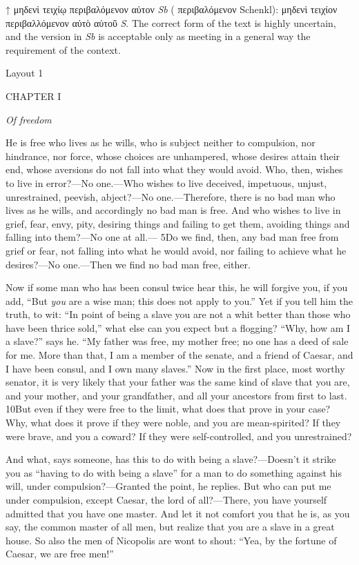 

↑ μηδενὶ τειχίῳ περιβαλόμενον αὐτον \emph{Sb} ( περιβαλόμενον Schenkl): μηδενὶ τειχίον περιβαλλόμενον αὐτὸ αὐτοῦ \emph{S}. The correct form of the text is highly uncertain, and the version in \emph{Sb} is acceptable only as meeting in a general way the requirement of the context.



Layout 1

CHAPTER I

\emph{Of freedom}

He is free who lives as he wills, who is subject neither to compulsion, nor hindrance, nor force, whose choices are unhampered, whose desires attain their end, whose aversions do not fall into what they would avoid. Who, then, wishes to live in error?—No one.—Who wishes to live deceived, impetuous, unjust, unrestrained, peevish, abject?—No one.—Therefore, there is no bad man who lives as he wills, and accordingly no bad man is free. And who wishes to live in grief, fear, envy, pity, desiring things and failing to get them, avoiding things and falling into them?—No one at all.— 5Do we find, then, any bad man free from grief or fear, not falling into what he would avoid, nor failing to achieve what he desires?—No one.—Then we find no bad man free, either.

Now if some man who has been consul twice hear this, he will forgive you, if you add, ``But \emph{you} are a wise man; this does not apply to you.'' Yet if you tell him the truth, to wit: ``In point of being a slave you are not a whit better than those who have been thrice sold,'' what else can you expect but a flogging? ``Why, how am I a slave?'' says he. ``My father was free, my mother free; no one has a deed of sale for me. More than that, I am a member of the senate, and a friend of Caesar, and I have been consul, and I own many slaves.'' Now in the first place, most worthy senator, it is very likely that your father was the same kind of slave that you are, and your mother, and your grandfather, and all your ancestors from first to last. 10But even if they were free to the limit, what does that prove in your case? Why, what does it prove if they were noble, and you are mean-spirited? If they were brave, and you a coward? If they were self-controlled, and you unrestrained?

And what, says someone, has this to do with being a slave?—Doesn't it strike you as ``having to do with being a slave'' for a man to do something against his will, under compulsion?—Granted the point, he replies. But who can put me under compulsion, except Caesar, the lord of all?—There, you have yourself admitted that you have one master. And let it not comfort you that he is, as you say, the common master of all men, but realize that you are a slave in a great house. So also the men of Nicopolis are wont to shout: ``Yea, by the fortune of Caesar, we are free men!''

